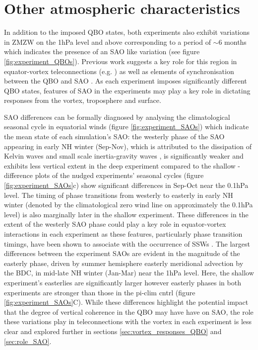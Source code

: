 \section{Other atmospheric characteristics}

In addition to the imposed QBO states, both experiments also exhibit variations in ZMZW on the 1hPa level and above corresponding to a period of $\sim$6 months which indicates the presence of an SAO like variation (see figure \ref{fig:experiment_QBOs}). Previous work suggests a key role for this region in equator-vortex teleconnections (e.g. \cite{grayForecasting2020a}) as well as elements of synchronisation between the QBO and SAO \citep{kuaiNonstationary2009c}. As each experiment imposes significantly different QBO states, features of SAO in the experiments may play a key role in dictating responses from the vortex, troposphere and surface.

SAO differences can be formally diagnosed by analysing the climatological seasonal cycle in equatorial winds (figure \ref{fig:experiment_SAOs}) which indicate the mean state of each simulation's SAO: the westerly phase of the SAO appearing in early NH winter (Sep-Nov), which is attributed to the dissipation of Kelvin waves and small scale inertia-gravity waves \citep{dunkertonRole1979, hitchmanEstimation1988}, is significantly weaker and exhibits less vertical extent in the deep experiment compared to the shallow - difference plots of the nudged experiments' seasonal cycles (figure \ref{fig:experiment_SAOs}c) show significant differences in Sep-Oct near the 0.1hPa level. The timing of phase transitions from westerly to easterly in early NH winter (denoted by the climatological zero wind line on approximately the 0.1hPa level) is also marginally later in the shallow experiment. These differences in the extent of the westerly SAO phase could play a key role in equator-vortex interactions in each experiment as these features, particularly phase transition timings, have been shown to associate with the occurrence of SSWs \citep{grayData2001, hamiltonEffects1998}. The largest differences between the experiment SAOs are evident in the magnitude of the easterly phase, driven by summer hemisphere easterly meridional advection by the BDC, in mid-late NH winter (Jan-Mar) near the 1hPa level. Here, the shallow experiment's easterlies are significantly larger however easterly phases in both experiments are stronger than those in the pi-clim cntrl (figure \ref{fig:experiment_SAOs}C). While these differences highlight the potential impact that the degree of vertical coherence in the QBO may have have on SAO, the role these variations play in teleconnections with the vortex in each experiment is less clear and explored further in sections \ref{sec:vortex_responses_QBO} and \ref{sec:role_SAO}.


